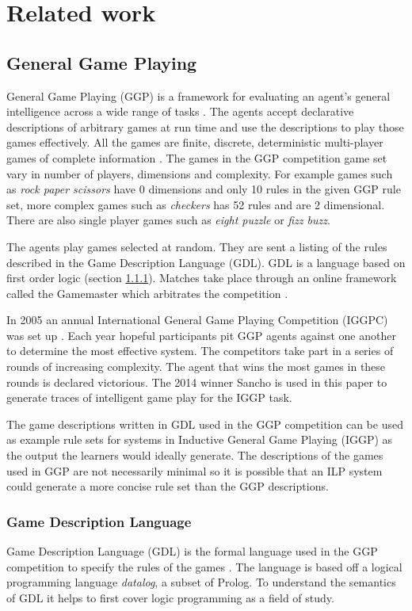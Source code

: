 \chapter{Related work}

\section{General Game Playing}

General Game Playing (GGP) is a framework for evaluating an agent's general intelligence across a wide range of tasks \cite{Cropper/IGGP,Genesereth/GGPOverview}. The agents accept declarative descriptions of arbitrary games at run time and use the descriptions to play those games effectively. All the games are finite, discrete, deterministic multi-player games of complete information \cite{GDL_Spec}. The games in the GGP competition game set vary in number of players, dimensions and complexity. For example games such as \textit{rock paper scissors} have 0 dimensions and only 10 rules in the given GGP rule set, more complex games such as \textit{checkers} has 52 rules and are 2 dimensional. There are also single player games such as \textit{eight puzzle} or \textit{fizz buzz}.

The agents play games selected at random. They are sent a listing of the rules described in the Game Description Language (GDL). GDL is a language based on first order logic (section \ref{sec:GDL}). Matches take place through an online framework called the Gamemaster which arbitrates the competition  \cite{Genesereth/GGPOverview}.

In 2005 an annual International General Game Playing Competition (IGGPC) was set up \cite{Kowalski/GGP}. Each year hopeful participants pit GGP agents against one another to determine the most effective system. The competitors take part in a series of rounds of increasing complexity. The agent that wins the most games in these rounds is declared victorious. The 2014 winner Sancho is used in this paper to generate traces of intelligent game play for the IGGP task.

The game descriptions written in GDL used in the GGP competition can be used as example rule sets for systems in Inductive General Game Playing (IGGP) as the output the learners would ideally generate. The descriptions of the games used in GGP are not necessarily minimal so it is possible that an ILP system could generate a more concise rule set than the GGP descriptions.

\subsection{Game Description Language}\label{sec:GDL}
Game Description Language (GDL) is the formal language used in the GGP competition to specify the rules of the games \cite{GDL_Spec}. The language is based off a logical programming language \textit{datalog}, a subset of Prolog. To understand the semantics of GDL it helps to first cover logic programming as a field of study.
